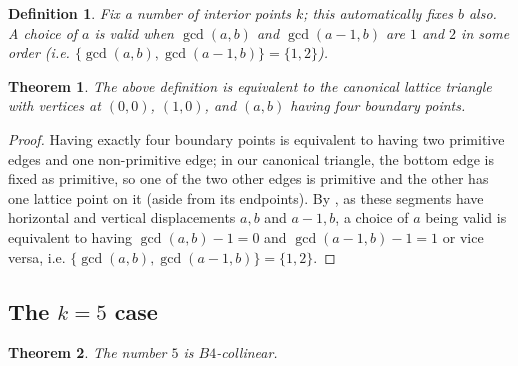\documentclass{article}
\theoremstyle{mydefstyle}
\newtheorem{theorem}{Theorem}
\newtheorem*{definition}{Definition}
\begin{document}
\begin{definition}
Fix a number of interior points $k$; this automatically fixes $b$ also. A choice of $a$ is \textit{valid} when $\gcd(a,b)$ and $\gcd(a-1,b)$ are $1$ and $2$ in some order (i.e. $\{\gcd(a,b),\gcd(a-1,b)\}=\{1,2\}$). 
\end{definition}

\begin{theorem}
The above definition is equivalent to the canonical lattice triangle with vertices at $(0,0)$, $(1,0)$, and $(a,b)$ having four boundary points. 
\end{theorem}
\begin{proof}
Having exactly four boundary points is equivalent to having two primitive edges and one non-primitive edge; in our canonical triangle, the bottom edge is fixed as primitive, so one of the two other edges is primitive and the other has one lattice point on it (aside from its endpoints). By , as these segments have horizontal and vertical displacements $a,b$ and $a-1,b$, a choice of $a$ being valid is equivalent to having $\gcd(a,b)-1=0$ and $\gcd(a-1,b)-1=1$ or vice versa, i.e. $\{\gcd(a,b),\gcd(a-1,b)\}=\{1,2\}$. 
\end{proof}
\newpage
\subsection{The $k=5$ case}

\begin{theorem}
\label{five:label}
The number $5$ is $B4$-collinear. 
\end{theorem}
\end{document}
